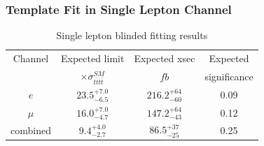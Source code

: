 \documentclass{beamer}
\begin{document}
\begin{frame}
\frametitle{Template Fit in Single Lepton Channel}
\vspace{-10pt}
\begin{table}
{\tiny
\caption{Single lepton blinded fitting results}
\vspace{0pt} 
\begin{tabular}{| c | c | c | c |}
\hline
Channel	&Expected limit	&Expected xsec	&Expected \\
 & $\times \sigma_{t\bar{t}t\bar{t}}^{SM}$ &  $fb$ &significance \\
\hline
$e$			& $23.5^{+7.0}_{-6.5}$ & $216.2^{+64}_{-60}$ &  0.09\\
\hline
$\mu$		& $16.0^{+7.0}_{-4.7}$ & $147.2^{+64}_{-43}$ &  0.12 \\
\hline
combined	& $9.4^{+4.0}_{-2.7}$ & $86.5^{+37}_{-25}$ & 0.25 \\
\hline
\end{tabular} 
}
\end{table}


\end{frame}
\end{document}
